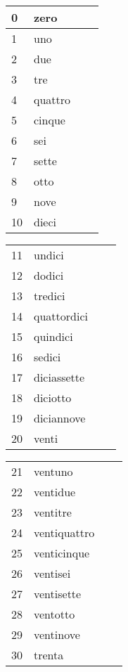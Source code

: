 \documentclass[letter,11pt]{article}
\begin{document}
\begin{multicols}{4}
\begin{tabular}{ |p{0.5cm}| p{2cm}| p{0.5cm}| p{3cm}| }

    \hline
    \hline

    0 & zero  \\ \hline
    1 & uno \\ \hline
    2 & due  \\ \hline
    3 & tre \\ \hline
    4 & quattro \\ \hline
    5 & cinque \\ \hline
    6 & sei \\ \hline
    7 & sette \\ \hline
    8 & otto \\ \hline
    9 & nove \\ \hline
    10 & dieci \\ \hline
    \hline
    \end{tabular}

    \begin{tabular}{ |p{0.5cm}| p{2cm}| p{0.5cm}| p{3cm}| }

    \hline
    \hline

     &   \\ \hline
    11 & undici \\ \hline
    12 & dodici  \\ \hline
    13 & tredici \\ \hline
    14 & quattordici \\ \hline
    15 & quindici \\ \hline
    16 & sedici \\ \hline
    17 & diciassette \\ \hline
    18 & diciotto \\ \hline
    19 & diciannove \\ \hline
    20 & venti \\ \hline
    \hline
    \end{tabular}

    \begin{tabular}{ |p{0.5cm}| p{2cm}| p{0.5cm}| p{3cm}| }

    \hline
    \hline

     &   \\ \hline
    21 & ventuno \\ \hline
    22 & ventidue  \\ \hline
    23 & ventitre \\ \hline
    24 & ventiquattro \\ \hline
    25 & venticinque \\ \hline
    26 & ventisei \\ \hline
    27 & ventisette \\ \hline
    28 & ventotto \\ \hline
    29 & ventinove \\ \hline
    30 & trenta \\ \hline
    \hline
    \end{tabular}


\end{multicols}
\end{document}
